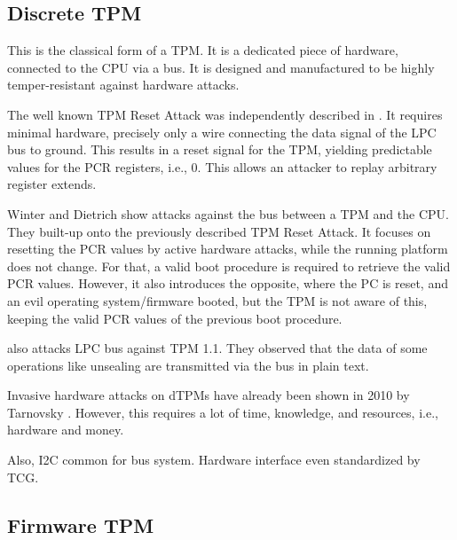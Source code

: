\subsection{Discrete TPM}

This is the classical form of a TPM. It is a dedicated piece of hardware, connected to the CPU via a bus. It is designed and manufactured to be highly temper-resistant against hardware attacks.

The well known TPM Reset Attack was independently described in \cite{kauerBernhard,sparks2007}. It requires minimal hardware, precisely only a wire connecting the data signal of the LPC bus to ground. This results in a reset signal for the TPM, yielding predictable values for the PCR registers, i.e., 0. This allows an attacker to replay arbitrary register extends.

Winter and Dietrich \cite{Winter2013} show attacks against the bus between a TPM and the CPU. They built-up onto the previously described TPM Reset Attack. It focuses on resetting the PCR values by active hardware attacks, while the running platform does not change. For that, a valid boot procedure is required to retrieve the valid PCR values. However, it also introduces the opposite, where the PC is reset, and an evil operating system/firmware booted, but the TPM is not aware of this, keeping the valid PCR values of the previous boot procedure.

\cite{Kursawe2005AnalyzingTP} also attacks LPC bus against TPM 1.1. They observed that the data of some operations like unsealing are transmitted via the bus in plain text.

Invasive hardware attacks on dTPMs have already been shown in 2010 by Tarnovsky \cite{tarnovsky}. However, this requires a lot of time, knowledge, and resources, i.e., hardware and money.

Also, I2C common for bus system. Hardware interface even standardized by TCG.


\subsection{Firmware TPM}

